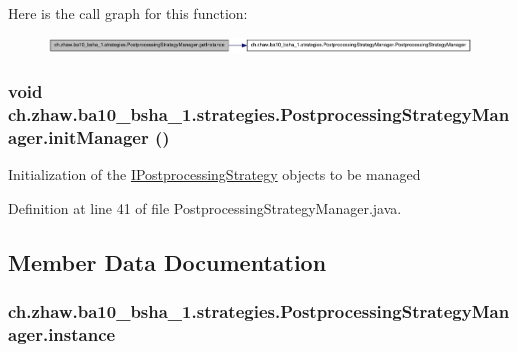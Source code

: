 Here is the call graph for this function:\nopagebreak
\begin{figure}[H]
\begin{center}
\leavevmode
\includegraphics[width=420pt]{classch_1_1zhaw_1_1ba10__bsha__1_1_1strategies_1_1PostprocessingStrategyManager_a3c81006dedcd5201183eefdcc9c84b45_cgraph}
\end{center}
\end{figure}
\hypertarget{classch_1_1zhaw_1_1ba10__bsha__1_1_1strategies_1_1PostprocessingStrategyManager_aff24c51c23f269fd1d9a09416b09ce06}{
\subsubsection[{initManager}]{\setlength{\rightskip}{0pt plus 5cm}void ch.zhaw.ba10\_\-bsha\_\-1.strategies.PostprocessingStrategyManager.initManager ()}}
\label{classch_1_1zhaw_1_1ba10__bsha__1_1_1strategies_1_1PostprocessingStrategyManager_aff24c51c23f269fd1d9a09416b09ce06}
Initialization of the \hyperlink{interfacech_1_1zhaw_1_1ba10__bsha__1_1_1strategies_1_1IPostprocessingStrategy}{IPostprocessingStrategy} objects to be managed 

Definition at line 41 of file PostprocessingStrategyManager.java.

\subsection{Member Data Documentation}
\hypertarget{classch_1_1zhaw_1_1ba10__bsha__1_1_1strategies_1_1PostprocessingStrategyManager_a00a270ffa254966fbdf5366a470b1ebf}{
\subsubsection[{instance}]{ {\bf ch.zhaw.ba10\_\-bsha\_\-1.strategies.PostprocessingStrategyManager.instance}}}
\label{classch_1_1zhaw_1_1ba10__bsha__1_1_1strategies_1_1PostprocessingStrategyManager_a00a270ffa254966fbdf5366a470b1ebf}


